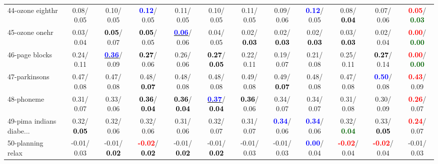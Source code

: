 \begin{table}[h]
\begin{center}
{\begin{tabular}{lc|c|c|c|c|c|c|c|c|c|c}
44-ozone eighthr &   0.08/  0.05 &   0.10/  0.05 & \textcolor{blue}{\textbf{  0.12}}/  0.05 &   0.11/  0.05 &   0.10/  0.05 &   0.11/  0.05 &   0.09/  0.06 & \textcolor{blue}{\textbf{  0.12}}/  0.05 &   0.08/\textcolor{black}{\textbf{  0.04}} &   0.07/  0.06 & \textcolor{red}{\textbf{  0.05}}/\textcolor{darkgreen}{\textbf{  0.03}} \\
45-ozone onehr &   0.03/  0.04 & \textcolor{black}{\textbf{  0.05}}/  0.07 & \textcolor{black}{\textbf{  0.05}}/  0.05 & \underline{\textcolor{blue}{\textbf{  0.06}}}/  0.06 &   0.04/  0.05 &   0.02/\textcolor{black}{\textbf{  0.03}} &   0.02/\textcolor{black}{\textbf{  0.03}} &   0.02/\textcolor{black}{\textbf{  0.03}} &   0.03/\textcolor{black}{\textbf{  0.03}} &   0.02/  0.04 & \textcolor{red}{\textbf{  0.00}}/\textcolor{darkgreen}{\textbf{  0.00}} \\
46-page blocks &   0.24/  0.11 & \underline{\textcolor{blue}{\textbf{  0.36}}}/  0.09 & \textcolor{black}{\textbf{  0.27}}/  0.06 &   0.26/  0.06 & \textcolor{black}{\textbf{  0.27}}/\textcolor{black}{\textbf{  0.05}} &   0.22/  0.11 &   0.19/  0.07 &   0.21/  0.08 &   0.25/  0.11 & \textcolor{black}{\textbf{  0.27}}/  0.14 & \textcolor{red}{\textbf{  0.00}}/\textcolor{darkgreen}{\textbf{  0.00}} \\ \hline
47-parkinsons &   0.47/  0.08 &   0.47/  0.08 &   0.48/\textcolor{black}{\textbf{  0.07}} &   0.48/  0.08 &   0.48/  0.08 &   0.49/  0.08 &   0.49/\textcolor{black}{\textbf{  0.07}} &   0.48/  0.08 &   0.47/  0.08 & \textcolor{blue}{\textbf{  0.50}}/  0.08 & \textcolor{red}{\textbf{  0.43}}/  0.09 \\
48-phoneme &   0.31/  0.07 &   0.33/  0.06 & \textcolor{black}{\textbf{  0.36}}/\textcolor{black}{\textbf{  0.04}} & \textcolor{black}{\textbf{  0.36}}/\textcolor{black}{\textbf{  0.04}} & \underline{\textcolor{blue}{\textbf{  0.37}}}/\textcolor{black}{\textbf{  0.04}} & \textcolor{black}{\textbf{  0.36}}/  0.06 &   0.34/  0.07 &   0.34/  0.07 &   0.31/  0.08 &   0.30/  0.09 & \textcolor{red}{\textbf{  0.26}}/  0.07 \\
49-pima indians diabe... &   0.32/\textcolor{black}{\textbf{  0.05}} &   0.32/  0.06 &   0.32/  0.06 &   0.31/  0.06 &   0.32/  0.07 &   0.31/  0.07 & \textcolor{blue}{\textbf{  0.34}}/  0.06 & \textcolor{blue}{\textbf{  0.34}}/  0.06 &   0.32/\textcolor{darkgreen}{\textbf{  0.04}} &   0.33/\textcolor{black}{\textbf{  0.05}} & \textcolor{red}{\textbf{  0.24}}/  0.07 \\
50-planning relax &  -0.01/  0.03 &  -0.01/\textcolor{black}{\textbf{  0.02}} & \textcolor{red}{\textbf{ -0.02}}/\textcolor{black}{\textbf{  0.02}} &  -0.01/\textcolor{black}{\textbf{  0.02}} &  -0.01/\textcolor{black}{\textbf{  0.02}} &  -0.01/  0.03 &  -0.01/  0.03 & \textcolor{blue}{\textbf{  0.00}}/  0.04 & \textcolor{red}{\textbf{ -0.02}}/  0.04 & \textcolor{red}{\textbf{ -0.02}}/  0.04 &  -0.01/  0.03 \\

\end{tabular}}
\end{center}
\end{table}
